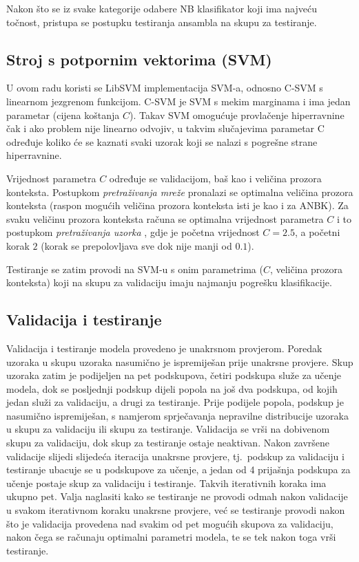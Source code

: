 \documentclass[10pt, a4paper]{article}
\begin{document}
Nakon što se iz svake kategorije odabere NB klasifikator koji ima najveću točnost,
pristupa se postupku testiranja ansambla na skupu za testiranje.

\subsection{Stroj s potpornim vektorima (SVM)}
U ovom radu koristi se LibSVM implementacija \mbox{SVM-a}, odnosno C-SVM s linearnom
jezgrenom funkcijom. 
\mbox{C-SVM} je SVM s mekim marginama i ima jedan parametar (cijena koštanja $C$).
Takav SVM omogućuje provlačenje hiperravnine čak i ako problem
nije linearno odvojiv, u takvim slučajevima parametar C određuje koliko će
se kaznati svaki uzorak koji se nalazi s pogrešne strane hiperravnine.

Vrijednost parametra $C$ određuje se validacijom, baš kao
i veličina prozora konteksta.
Postupkom \emph{pretraživanja mreže}  pronalazi se
optimalna veličina prozora konteksta (raspon mogućih veličina prozora konteksta
isti je kao i za ANBK). Za svaku veličinu prozora konteksta računa se
optimalna vrijednost parametra $C$ i to postupkom \emph{pretraživanja uzorka} ,
gdje je početna vrijednost $C = 2.5$, a početni korak $2$ (korak se prepolovljava sve dok nije manji od $0.1$).

Testiranje se zatim
provodi na SVM-u s onim parametrima ($C$, veličina prozora konteksta)
koji na skupu za validaciju imaju najmanju pogrešku klasifikacije.

\subsection{Validacija i testiranje}
Validacija i testiranje modela provedeno je unakrsnom provjerom.
Poredak uzoraka u skupu uzoraka nasumično je ispremiješan prije
unakrsne provjere.
Skup uzoraka zatim je podijeljen na pet podskupova, četiri podskupa
služe za učenje modela, dok se posljednji podskup dijeli popola
na još dva podskupa, od kojih jedan služi za validaciju, a drugi za testiranje.
Prije podijele popola, podskup je nasumično ispremiješan, s
namjerom sprječavanja nepravilne distribucije uzoraka u skupu za validaciju
ili skupu za testiranje. Validacija se vrši na dobivenom skupu za validaciju, 
dok skup za testiranje ostaje neaktivan. Nakon završene validacije
slijedi slijedeća iteracija unakrsne provjere, tj.~podskup za validaciju
i testiranje ubacuje se u podskupove za učenje, a jedan od 4 prijašnja podskupa
za učenje postaje skup za validaciju i testiranje. Takvih iterativnih koraka ima ukupno
pet. Valja naglasiti kako se testiranje ne provodi odmah nakon validacije u svakom
iterativnom koraku unakrsne provjere, već se testiranje provodi nakon što je validacija
provedena nad svakim od pet mogućih skupova za validaciju, nakon čega se računaju
optimalni parametri modela, te se tek nakon toga vrši testiranje. 
\end{document}
